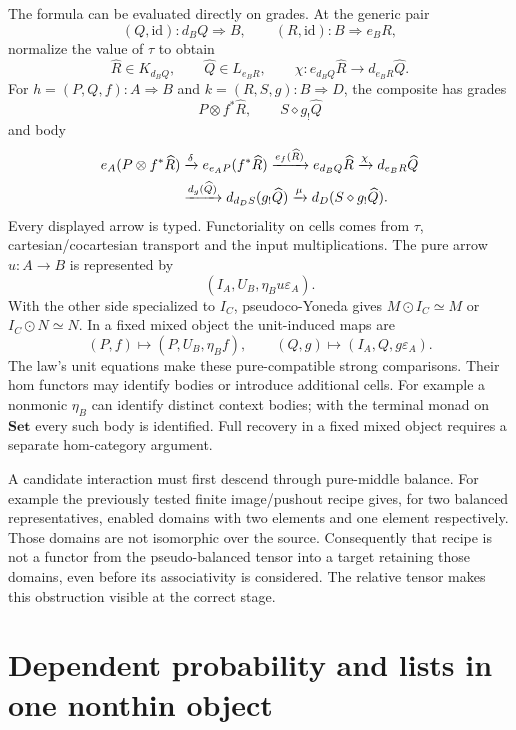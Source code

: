 \documentclass[11pt]{article}
\theoremstyle{definition}
\newcommand{\Set}{\mathbf{Set}}
\newcommand{\id}{\mathrm{id}}
\begin{document}
The formula can be evaluated directly on grades. At the generic pair
\[
 (Q,\id):d_BQ\Rightarrow B,\qquad(R,\id):B\Rightarrow e_BR,
\]
normalize the value of $\tau$ to obtain
\[
 \widehat R\in K_{d_BQ},\qquad \widehat Q\in L_{e_BR},\qquad
 \chi:e_{d_BQ}\widehat R\longrightarrow d_{e_BR}\widehat Q.
\]
For $h=(P,Q,f):A\Rightarrow B$ and $k=(R,S,g):B\Rightarrow D$, the composite
has grades
\begin{equation}\label{eq:mixedgrades}
 P\otimes f^*\widehat R,\qquad S\diamond g_!\widehat Q
\end{equation}
and body
\begin{align}\label{eq:mixedbody}
 e_A(P\otimes f^*\widehat R)
 &\xrightarrow{\delta}e_{e_AP}(f^*\widehat R)
 \xrightarrow{e_f(\widehat R)}e_{d_BQ}\widehat R
 \xrightarrow{\chi}d_{e_BR}\widehat Q\notag\\
 &\xrightarrow{d_g(\widehat Q)}d_{d_DS}(g_!\widehat Q)
 \xrightarrow{\mu}d_D(S\diamond g_!\widehat Q).
\end{align}
Every displayed arrow is typed. Functoriality on cells comes from $\tau$,
cartesian/cocartesian transport and the input multiplications. The pure arrow
$u:A\to B$ is represented by
\[
 (I_A,U_B,\eta_Bu\varepsilon_A).
\]
With the other side specialized to $I_C$, pseudoco-Yoneda gives $M\odot I_C
\simeq M$ or $I_C\odot N\simeq N$. In a fixed mixed object the unit-induced
maps are
\begin{equation}\label{eq:onesided}
 (P,f)\longmapsto(P,U_B,\eta_Bf),\qquad
 (Q,g)\longmapsto(I_A,Q,g\varepsilon_A).
\end{equation}
The law's unit equations make these pure-compatible strong comparisons.
Their hom functors may identify bodies or introduce additional cells. For
example a nonmonic $\eta_B$ can identify distinct context bodies; with the
terminal monad on $\Set$ every such body is identified. Full recovery in a
fixed mixed object requires a separate hom-category argument.

A candidate interaction must first descend through pure-middle balance.
For example the previously tested finite image/pushout recipe gives, for two
balanced representatives, enabled domains with two elements and one element
respectively. Those domains are not isomorphic over the source. Consequently
that recipe is not a functor from the pseudo-balanced tensor into a target
retaining those domains, even before its associativity is considered. The
relative tensor makes this obstruction visible at the correct stage.

\section{Dependent probability and lists in one nonthin object}\label{sec:prob}
\end{document}
